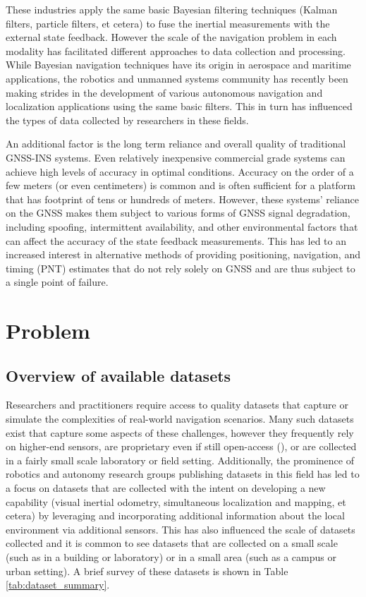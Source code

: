 \documentclass[Afour,sageh,times]{sagej}
\begin{document}
These industries apply the same basic Bayesian filtering techniques (Kalman filters, particle filters, et cetera) to fuse the inertial measurements with the external state feedback. However the scale of the navigation problem in each modality has facilitated different approaches to data collection and processing. While Bayesian navigation techniques have its origin in aerospace and maritime applications, the robotics and unmanned systems community has recently been making strides in the development of various autonomous navigation and localization applications using the same basic filters. This in turn has influenced the types of data collected by researchers in these fields.

An additional factor is the long term reliance and overall quality of traditional GNSS-INS systems. Even relatively inexpensive commercial grade systems can achieve high levels of accuracy in optimal conditions. Accuracy on the order of a few meters (or even centimeters) is common and is often sufficient for a platform that has footprint of tens or hundreds of meters. However, these systems' reliance on the GNSS makes them subject to various forms of GNSS signal degradation, including spoofing, intermittent availability, and other environmental factors that can affect the accuracy of the state feedback measurements. This has led to an increased interest in alternative methods of providing positioning, navigation, and timing (PNT) estimates that do not rely solely on GNSS and are thus subject to a single point of failure.

\section{{Problem}}
\subsection{Overview of available datasets}
Researchers and practitioners require access to quality datasets that capture or simulate the complexities of real-world navigation scenarios. Many such datasets exist that capture some aspects of these challenges, however they frequently rely on higher-end sensors, are proprietary even if still open-access (\cite{waymo}), or are collected in a fairly small scale laboratory or field setting. Additionally, the prominence of robotics and autonomy research groups publishing datasets in this field has led to a focus on datasets that are collected with the intent on developing a new capability (visual inertial odometry, simultaneous localization and mapping, et cetera) by leveraging and incorporating additional information about the local environment via additional sensors. This has also influenced the scale of datasets collected and it is common to see datasets that are collected on a small scale (such as in a building or laboratory) or in a small area (such as a campus or urban setting). A brief survey of these datasets is shown in Table \ref{tab:dataset_summary}.
\end{document}
